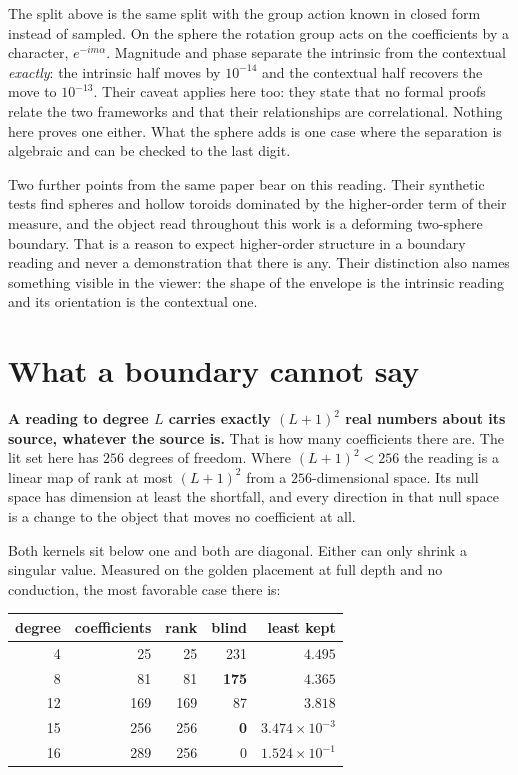 The split above is the same split with the group action known in closed form instead of sampled. On the sphere the rotation group acts on the coefficients by a character, \(e^{-im\alpha}\). Magnitude and phase separate the intrinsic from the contextual \emph{exactly}: the intrinsic half moves by \(10^{-14}\) and the contextual half recovers the move to \(10^{-13}\). Their caveat applies here too: they state that no formal proofs relate the two frameworks and that their relationships are correlational. Nothing here proves one either. What the sphere adds is one case where the separation is algebraic and can be checked to the last digit.

Two further points from the same paper bear on this reading. Their synthetic tests find spheres and hollow toroids dominated by the higher-order term of their measure, and the object read throughout this work is a deforming two-sphere boundary. That is a reason to expect higher-order structure in a boundary reading and never a demonstration that there is any. Their distinction also names something visible in the viewer: the shape of the envelope is the intrinsic reading and its orientation is the contextual one.

\section{What a boundary cannot say}
\label{sec:rank}

\textbf{A reading to degree \(L\) carries exactly \((L+1)^2\) real numbers about its source, whatever the source is.} That is how many coefficients there are. The lit set here has \(256\) degrees of freedom. Where \((L+1)^2 < 256\) the reading is a linear map of rank at most \((L+1)^2\) from a \(256\)-dimensional space. Its null space has dimension at least the shortfall, and every direction in that null space is a change to the object that moves no coefficient at all.

Both kernels sit below one and both are diagonal. Either can only shrink a singular value. Measured on the golden placement at full depth and no conduction, the most favorable case there is:

\begin{center}
\begin{tabular}{rrrrr}
\toprule
degree & coefficients & rank & blind & least kept \\
\midrule
4 & 25 & 25 & 231 & \(4.495\) \\
8 & 81 & 81 & \textbf{175} & \(4.365\) \\
12 & 169 & 169 & 87 & \(3.818\) \\
15 & 256 & 256 & \textbf{0} & \(3.474 \times 10^{-3}\) \\
16 & 289 & 256 & 0 & \(1.524 \times 10^{-1}\) \\
\bottomrule
\end{tabular}
\end{center}

